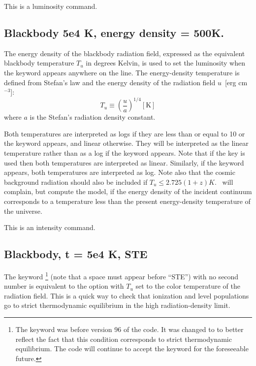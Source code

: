 This is a luminosity command.

\subsection{Blackbody 5e4 K, energy density = 500K.  }

The energy density of the blackbody radiation field, expressed as the
equivalent blackbody temperature $T_u$ in degrees Kelvin,
is used to set the
luminosity when the  keyword appears
anywhere on the line.
The energy-density temperature is defined from Stefan's law and the energy
density of the radiation field $u$~[erg cm$^{-3}$]:
\begin{equation}
T_u  \equiv \left( {\frac{u}{a}} \right)^{1/4}  [\mathrm{K}]%
\end{equation}
where $a$ is the Stefan's radiation density constant.

Both temperatures are interpreted as logs if they are less than or equal
to 10 or the keyword  appears, and linear otherwise.  They will be interpreted as the linear
temperature rather than as a log if the keyword  appears.  Note that
if the  key is used then both temperatures are interpreted as linear.
Similarly, if the keyword  appears, both temperatures are interpreted as log.
Note also that the cosmic background radiation should also be included if
$T_u\le 2.725 (1+z) K$.
\Cloudy\ will complain, but compute the model, if the
energy density of the incident continuum corresponds to a temperature less
than the present energy-density temperature of the universe.

This is an intensity command.

\subsection{Blackbody, t = 5e4 K, STE  }

The keyword \footnote{The keyword was  before version 96 of the code.  It was changed
to  to better reflect the fact that this condition corresponds to strict
thermodynamic equilibrium.
The code will continue to accept the  keyword
for the foreseeable future.}
(note that a space must appear before ``STE'') with no second number is
equivalent to the  option with $T_u$ set
to the color temperature
of the radiation field.
This is a quick way to check that ionization and
level populations go to strict thermodynamic equilibrium in the high
radiation-density limit.

